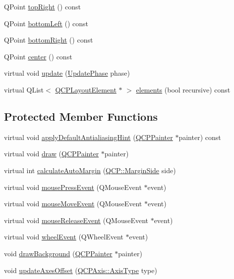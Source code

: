 \begin{DoxyCompactItemize}
\item 
Q\+Point \hyperlink{class_q_c_p_axis_rect_a232409546394c23b59407bc62fa460a8}{top\+Right} () const 
\item 
Q\+Point \hyperlink{class_q_c_p_axis_rect_a724b0333971ea6a338f0dbd814dc97ae}{bottom\+Left} () const 
\item 
Q\+Point \hyperlink{class_q_c_p_axis_rect_a49ea3c7dff834b47e266cbf3d79f78b9}{bottom\+Right} () const 
\item 
Q\+Point \hyperlink{class_q_c_p_axis_rect_aea5e6042bca198424fa1bc02fc282e59}{center} () const 
\item 
virtual void \hyperlink{class_q_c_p_axis_rect_a255080a017df9083a60a321ef2ba9ed8}{update} (\hyperlink{class_q_c_p_layout_element_a0d83360e05735735aaf6d7983c56374d}{Update\+Phase} phase)
\item 
virtual Q\+List$<$ \hyperlink{class_q_c_p_layout_element}{Q\+C\+P\+Layout\+Element} $\ast$ $>$ \hyperlink{class_q_c_p_axis_rect_a2bda6bf2b5b5797f92583cecd01c8949}{elements} (bool recursive) const 
\end{DoxyCompactItemize}
\subsection*{Protected Member Functions}
\begin{DoxyCompactItemize}
\item 
virtual void \hyperlink{class_q_c_p_axis_rect_a9a6dd0763701cbc7d01f899bcbb3f9ca}{apply\+Default\+Antialiasing\+Hint} (\hyperlink{class_q_c_p_painter}{Q\+C\+P\+Painter} $\ast$painter) const 
\item 
virtual void \hyperlink{class_q_c_p_axis_rect_afb1bbbbda8345cd2710d92ee48440b53}{draw} (\hyperlink{class_q_c_p_painter}{Q\+C\+P\+Painter} $\ast$painter)
\item 
virtual int \hyperlink{class_q_c_p_axis_rect_ae79f18302e6507586aa8c032a5f9ed1c}{calculate\+Auto\+Margin} (\hyperlink{namespace_q_c_p_a7e487e3e2ccb62ab7771065bab7cae54}{Q\+C\+P\+::\+Margin\+Side} side)
\item 
virtual void \hyperlink{class_q_c_p_axis_rect_a77501dbeccdac7256f7979b05077c04e}{mouse\+Press\+Event} (Q\+Mouse\+Event $\ast$event)
\item 
virtual void \hyperlink{class_q_c_p_axis_rect_a4baf3d5dd69166788f6ceda0ea182c6e}{mouse\+Move\+Event} (Q\+Mouse\+Event $\ast$event)
\item 
virtual void \hyperlink{class_q_c_p_axis_rect_adf6c99780cea55ab39459a6eaad3a94a}{mouse\+Release\+Event} (Q\+Mouse\+Event $\ast$event)
\item 
virtual void \hyperlink{class_q_c_p_axis_rect_a5acf41fc30aa68ea263246ecfad85c31}{wheel\+Event} (Q\+Wheel\+Event $\ast$event)
\item 
void \hyperlink{class_q_c_p_axis_rect_ab49d338d1ce74b476fcead5b32cf06dc}{draw\+Background} (\hyperlink{class_q_c_p_painter}{Q\+C\+P\+Painter} $\ast$painter)
\item 
void \hyperlink{class_q_c_p_axis_rect_a6024ccdc74f5dc0e8a0fe482e5b28a20}{update\+Axes\+Offset} (\hyperlink{class_q_c_p_axis_ae2bcc1728b382f10f064612b368bc18a}{Q\+C\+P\+Axis\+::\+Axis\+Type} type)
\end{DoxyCompactItemize}
